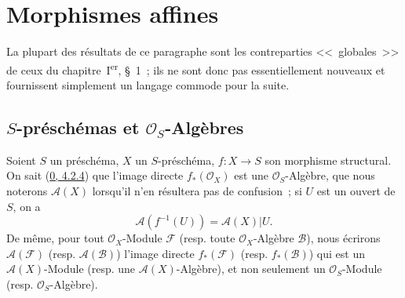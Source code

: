 \setcounter{section}{0}
\section{Morphismes affines}
\label{section:II.1-fr}

La plupart des résultats de ce paragraphe sont les contreparties
<<~globales~>> de ceux du chapitre~I\textsuperscript{er}, \S~1~; ils ne sont
donc pas essentiellement nouveaux et fournissent simplement un langage
commode pour la suite.

\setcounter{subsection}{0}
\subsection{$S$-préschémas et $\mathcal{O}_S$-Algèbres}
\label{subsection:II.1.1-fr}

\begin{env}[1.1.1]
\label{II.1.1.1-fr}
Soient $S$ un préschéma, $X$ un $S$-préschéma, $f:X\to S$ son morphisme
structural. On sait (\hyperref[0.4.2.4-fr]{0, 4.2.4}) que l'image directe
$f_*(\mathcal{O}_X)$ est une $\mathcal{O}_S$-Algèbre, que nous
noterons $\mathcal{A}(X)$ lorsqu'il n'en résultera pas de confusion~; si $U$
est un ouvert de $S$, on a
\[
  \mathcal{A}(f^{-1}(U))=\mathcal{A}(X)|U.
\]
De même, pour tout $\mathcal{O}_X$-Module $\mathcal{F}$ (resp. toute
$\mathcal{O}_X$-Algèbre $\mathcal{B}$), nous écrirons
$\mathcal{A}(\mathcal{F})$ (resp. $\mathcal{A}(\mathcal{B})$) l'image directe
$f_*(\mathcal{F})$ (resp. $f_*(\mathcal{B})$) qui est un
$\mathcal{A}(X)$-Module (resp. une $\mathcal{A}(X)$-Algèbre), et non seulement
un $\mathcal{O}_S$-Module (resp. $\mathcal{O}_S$-Algèbre).
\end{env}

